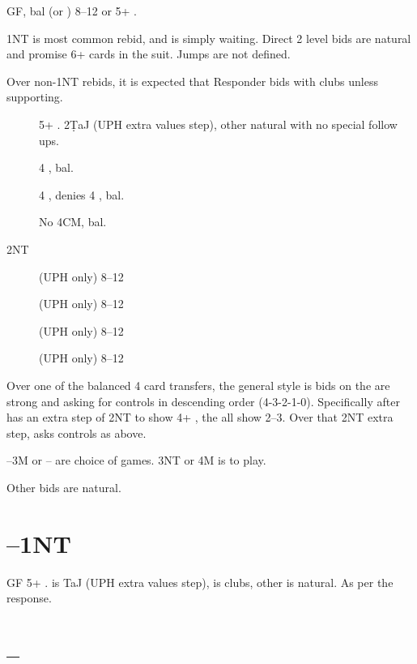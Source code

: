 \documentclass[tom-ari]{subfile}
\begin{document}
	GF, bal (or ) 8--12 or 5+ \clubsuit.
	
	1NT is most common rebid, and is simply waiting.  Direct 2 level bids are natural and promise 6+ cards in the suit.   Jumps are not defined.
	
	Over non-1NT rebids, it is expected that Responder bids  with clubs unless supporting.
	
	
	\begin{description}
		\item[] 5+ \clubsuit.  2\d TaJ (UPH extra values step), other natural with no special follow ups. 
		\item[] 4 \heartsuit, bal. 
		\item[] 4 \spadesuit, denies 4 \heartsuit, bal. 
		\item[] No 4CM, bal.  
		\item[2NT]  (UPH only) 8--12 
		\item[]  (UPH only) 8--12
		\item[]  (UPH only) 8--12
		\item[]  (UPH only) 8--12
	\end{description}

	
	Over one of the balanced 4 card transfers, the general style is bids on the  are strong and asking for controls in descending order (4-3-2-1-0).  Specifically  after  has an extra step of 2NT to show 4+ \spadesuit, the all show 2--3.  Over that 2NT extra step,  asks controls as above.
	
	--3M or -- are choice of games.  3NT or 4M is to play.
	
	Other bids are natural. 
	
	\section[1C--1NT]{--1NT}
	
	
	GF 5+ \heartsuit.   is TaJ (UPH extra values step),  is clubs, other is natural.  As per the  response.
	
	\section[1C--2C]{--}
	
\end{document}
